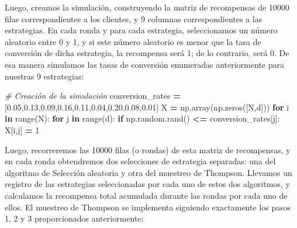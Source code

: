 \documentclass[
]{book}
\newenvironment{Shaded}{\begin{snugshade}}{\end{snugshade}}
\newcommand{\BuiltInTok}[1]{#1}
\newcommand{\CommentTok}[1]{\textcolor[rgb]{0.56,0.35,0.01}{\textit{#1}}}
\newcommand{\ControlFlowTok}[1]{\textcolor[rgb]{0.13,0.29,0.53}{\textbf{#1}}}
\newcommand{\DecValTok}[1]{\textcolor[rgb]{0.00,0.00,0.81}{#1}}
\newcommand{\FloatTok}[1]{\textcolor[rgb]{0.00,0.00,0.81}{#1}}
\newcommand{\KeywordTok}[1]{\textcolor[rgb]{0.13,0.29,0.53}{\textbf{#1}}}
\newcommand{\NormalTok}[1]{#1}
\newcommand{\OperatorTok}[1]{\textcolor[rgb]{0.81,0.36,0.00}{\textbf{#1}}}
\begin{document}
Luego, creamos la simulación, construyendo la matriz de recompensas de 10000 filas correspondientes a los clientes, y 9 columnas correspondientes a las estrategias. En cada ronda y para cada estrategia, seleccionamos un número aleatorio entre 0 y 1, y si este número aleatorio es menor que la tasa de conversión de dicha estrategia, la recompensa será 1; de lo contrario, será 0. De esa manera simulamos las tasas de conversión enumeradas anteriormente para nuestras 9 estrategias:

\begin{Shaded}
\begin{Highlighting}[]
\CommentTok{\# Creación de la simulación}
\NormalTok{conversion\_rates }\OperatorTok{=}\NormalTok{ [}\FloatTok{0.05}\NormalTok{,}\FloatTok{0.13}\NormalTok{,}\FloatTok{0.09}\NormalTok{,}\FloatTok{0.16}\NormalTok{,}\FloatTok{0.11}\NormalTok{,}\FloatTok{0.04}\NormalTok{,}\FloatTok{0.20}\NormalTok{,}\FloatTok{0.08}\NormalTok{,}\FloatTok{0.01}\NormalTok{]}
\NormalTok{X }\OperatorTok{=}\NormalTok{ np.array(np.zeros([N,d]))}
\ControlFlowTok{for}\NormalTok{ i }\KeywordTok{in} \BuiltInTok{range}\NormalTok{(N):}
    \ControlFlowTok{for}\NormalTok{ j }\KeywordTok{in} \BuiltInTok{range}\NormalTok{(d):}
        \ControlFlowTok{if}\NormalTok{ np.random.rand() }\OperatorTok{\textless{}=}\NormalTok{ conversion\_rates[j]:}
\NormalTok{            X[i,j] }\OperatorTok{=} \DecValTok{1}
\end{Highlighting}
\end{Shaded}

Luego, recorreremos las 10000 filas (o rondas) de esta matriz de recompensas, y en cada ronda obtendremos dos selecciones de estrategia separadas: una del algoritmo de Selección aleatoria y otra del muestreo de Thompson. Llevamos un registro de las estrategias seleccionadas por cada uno de estos dos algoritmos, y calculamos la recompensa total acumulada durante las rondas por cada uno de ellos. El muestreo de Thompson se implementa siguiendo exactamente los pasos 1, 2 y 3 proporcionados anteriormente:
\end{document}
